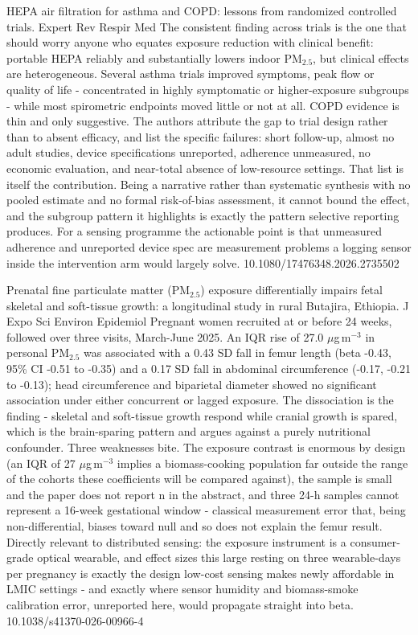 \documentclass[10pt]{article}
\begin{document}
{HEPA air filtration for asthma and COPD: lessons from randomized controlled trials.}
{Expert Rev Respir Med}
{The consistent finding across trials is the one that should worry anyone who equates exposure reduction with clinical benefit: portable HEPA reliably and substantially lowers indoor PM$_{2.5}$, but clinical effects are heterogeneous. Several asthma trials improved symptoms, peak flow or quality of life - concentrated in highly symptomatic or higher-exposure subgroups - while most spirometric endpoints moved little or not at all. COPD evidence is thin and only suggestive. The authors attribute the gap to trial design rather than to absent efficacy, and list the specific failures: short follow-up, almost no adult studies, device specifications unreported, adherence unmeasured, no economic evaluation, and near-total absence of low-resource settings. That list is itself the contribution. Being a narrative rather than systematic synthesis with no pooled estimate and no formal risk-of-bias assessment, it cannot bound the effect, and the subgroup pattern it highlights is exactly the pattern selective reporting produces. For a sensing programme the actionable point is that unmeasured adherence and unreported device spec are measurement problems a logging sensor inside the intervention arm would largely solve.}
{10.1080/17476348.2026.2735502}


{Prenatal fine particulate matter (PM$_{2.5}$) exposure differentially impairs fetal skeletal and soft-tissue growth: a longitudinal study in rural Butajira, Ethiopia.}
{J Expo Sci Environ Epidemiol}
{Pregnant women recruited at or before 24 weeks, followed over three visits, March-June 2025. An IQR rise of 27.0 $\mu$g\,m$^{-3}$ in personal PM$_{2.5}$ was associated with a 0.43 SD fall in femur length (beta -0.43, 95\% CI -0.51 to -0.35) and a 0.17 SD fall in abdominal circumference (-0.17, -0.21 to -0.13); head circumference and biparietal diameter showed no significant association under either concurrent or lagged exposure. The dissociation is the finding - skeletal and soft-tissue growth respond while cranial growth is spared, which is the brain-sparing pattern and argues against a purely nutritional confounder. Three weaknesses bite. The exposure contrast is enormous by design (an IQR of 27 $\mu$g\,m$^{-3}$ implies a biomass-cooking population far outside the range of the cohorts these coefficients will be compared against), the sample is small and the paper does not report n in the abstract, and three 24-h samples cannot represent a 16-week gestational window - classical measurement error that, being non-differential, biases toward null and so does not explain the femur result. Directly relevant to distributed sensing: the exposure instrument is a consumer-grade optical wearable, and effect sizes this large resting on three wearable-days per pregnancy is exactly the design low-cost sensing makes newly affordable in LMIC settings - and exactly where sensor humidity and biomass-smoke calibration error, unreported here, would propagate straight into beta.}
{10.1038/s41370-026-00966-4}
\end{document}
